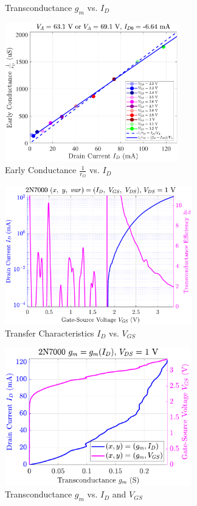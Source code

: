 \documentclass[UTF8]{article}
\begin{document}
\begin{center}
\begin{minipage}{0.45\columnwidth}
\begin{figure}[H]
            \caption{Transconductance $g_m$ vs. $I_D$}
        \end{figure}
    \end{minipage}\hfill\begin{minipage}{0.45\columnwidth}
        \begin{figure}[H]\centering
            \includegraphics[height=170pt]{LCE-04-场效应管/assets/2N7000/2N7000 (NMOS) [onsemi, KH32] current level high/2025-04-24_00-52-26__stc_rO_Id_Vgs.pdf}
            \caption{Early Conductance $\frac{1}{r_O}$ vs. $I_D$}
        \end{figure}
        \begin{figure}[H]\centering
            \includegraphics[height=170pt]{LCE-04-场效应管/assets/2N7000/2N7000 (NMOS) [onsemi, KH32] current level high/2025-04-24_00-55-13__stc_Id_Vgs_Vds_logscale.pdf}
            \caption{Transfer Characteristics $I_D$ vs. $V_{GS}$}
        \end{figure}
        \begin{figure}[H]\centering
            \includegraphics[height=170pt]{LCE-04-场效应管/assets/2N7000/2N7000 (NMOS) [onsemi, KH32] current level high/2025-04-24_00-52-35__stc_gm_IdVgs_yyplot.pdf}
            \caption{Transconductance $g_m$ vs. $I_D$ and $V_{GS}$}
    \end{figure}
\end{minipage}\end{center}
\end{document}
